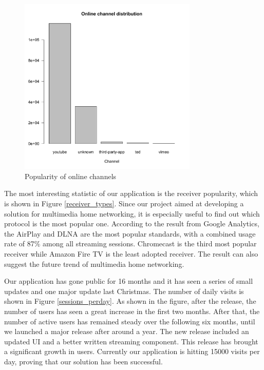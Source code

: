 \begin{figure}[htb]
\centering \includegraphics[height=8.5cm]{charts/online_channel}
\caption{Popularity of online channels \label{online_channel}}
\end{figure}

The most interesting statistic of our application is the receiver popularity,
which is shown in Figure \ref{receiver_types}. Since our project aimed at
developing a solution for multimedia home networking, it is especially useful
to find out which protocol is the most popular one. According to the result
from Google Analytics, the AirPlay and DLNA are the most popular standards,
with a combined   usage rate of 87\% among all streaming sessions. Chromecast
is the third most popular receiver while Amazon Fire TV is the least adopted
receiver. The result can also suggest the future trend of multimedia home
networking.

Our application has gone public for 16 months and it has seen a series of small
updates and one major update last Christmas. The number of daily visits is
shown in Figure \ref{sessions_perday}. As shown in the figure, after the
release, the number of users has seen a great increase in the first two months.
After that, the number of active users has remained steady over the following
six months, until we launched a major release after around a year. The new
release included an updated UI and a better written streaming component. This
release has brought a significant growth in users. Currently our application is
hitting 15000 visits per day,  proving that our solution has been successful.

